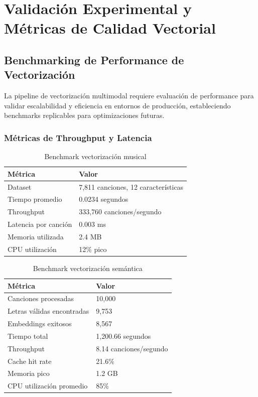 \documentclass[12pt,a4paper]{article}
\begin{document}
\section{Validación Experimental y Métricas de Calidad Vectorial}

\subsection{Benchmarking de Performance de Vectorización}

La pipeline de vectorización multimodal requiere evaluación de performance para validar escalabilidad y eficiencia en entornos de producción, estableciendo benchmarks replicables para optimizaciones futuras.

\subsubsection{Métricas de Throughput y Latencia}

\begin{table}[h]
\centering
\caption{Benchmark vectorización musical}
\begin{tabular}{@{}ll@{}}
\toprule
\textbf{Métrica} & \textbf{Valor} \\
\midrule
Dataset & 7,811 canciones, 12 características \\
Tiempo promedio & 0.0234 segundos \\
Throughput & 333,760 canciones/segundo \\
Latencia por canción & 0.003 ms \\
Memoria utilizada & 2.4 MB \\
CPU utilización & 12\% pico \\
\bottomrule
\end{tabular}
\end{table}

\begin{table}[h]
\centering
\caption{Benchmark vectorización semántica}
\begin{tabular}{@{}ll@{}}
\toprule
\textbf{Métrica} & \textbf{Valor} \\
\midrule
Canciones procesadas & 10,000 \\
Letras válidas encontradas & 9,753 \\
Embeddings exitosos & 8,567 \\
Tiempo total & 1,200.66 segundos \\
Throughput & 8.14 canciones/segundo \\
Cache hit rate & 21.6\% \\
Memoria pico & 1.2 GB \\
CPU utilización promedio & 85\% \\
\bottomrule
\end{tabular}
\end{table}
\end{document}
